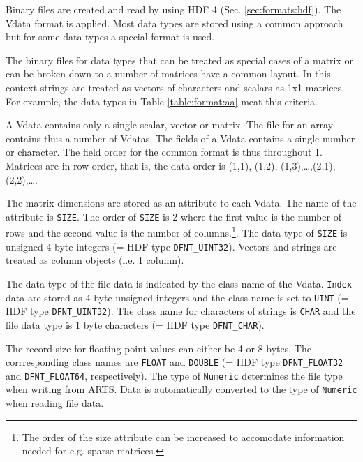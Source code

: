  \label{sec:formats:file:binary}
  
 Binary files are created and read by using HDF 4 (Sec.
 \ref{sec:formats:hdf}). The Vdata format is applied. Most data types
 are stored using a common approach but for some data types a special 
 format is used.

 \label{sec:formats:file:binary:general}
 
 The binary files for data types that can be treated as special cases
 of a matrix or can be broken down to a number of matrices have a
 common layout. In this context strings are treated as vectors of
 characters and scalars as 1x1 matrices. For example, the data types
 in Table \ref{table:format:aa} meat this criteria.
 
 A Vdata contains only a single scalar, vector or matrix. The file for
 an array contains thus a number of Vdatas. The fields of a Vdata
 contains a single number or character. The field order for the common
 format is thus throughout 1. Matrices are in row order, that is, 
 the data order is (1,1), (1,2), (1,3),\dots,(2,1),(2,2),\dots.
 
 The matrix dimensions are stored as an attribute to each Vdata. The
 name of the attribute is \verb|SIZE|. The order of \verb|SIZE| is 2
 where the first value is the number of rows and the second value is
 the number of columns.\footnote{The order of the size attribute can
   be increased to accomodate information needed for e.g. sparse
   matrices.}. The data type of \verb|SIZE| is unsigned 4 byte
 integers (= HDF type \verb|DFNT_UINT32|). Vectors and strings are
 treated as column objects (i.e. 1 column).
 
 The data type of the file data is indicated by the class name of the
 Vdata. \verb|Index| data are stored as 4 byte unsigned integers and
 the class name is set to \verb|UINT| (= HDF type \verb|DFNT_UINT32|).
 The class name for characters of strings is \verb|CHAR| and the file
 data type is 1 byte characters (= HDF type \verb|DFNT_CHAR|).

 The record size for floating point values can either be 4 or 8 bytes.
 The corrresponding class names are \verb|FLOAT| and \verb|DOUBLE|
 (= HDF type \verb|DFNT_FLOAT32| and \verb|DFNT_FLOAT64|, respectively).
 The type of \verb|Numeric| determines the file type when writing from
 ARTS. Data is automatically converted to the type of \verb|Numeric|
 when reading file data.
 
